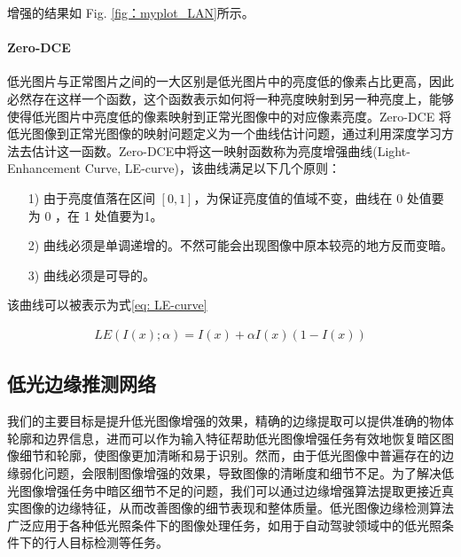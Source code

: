 \documentclass[a4paper]{ctexart}
\begin{document}
	增强的结果如 Fig. \ref{fig：myplot_LAN}所示。
	
	\paragraph{Zero-DCE} 
	
	低光图片与正常图片之间的一大区别是低光图片中的亮度低的像素占比更高，因此必然存在这样一个函数，这个函数表示如何将一种亮度映射到另一种亮度上，能够使得低光图片中亮度低的像素映射到正常光图像中的对应像素亮度。Zero-DCE 将低光图像到正常光图像的映射问题定义为一个曲线估计问题，通过利用深度学习方法去估计这一函数。Zero-DCE中将这一映射函数称为亮度增强曲线(Light-Enhancement Curve, LE-curve)，该曲线满足以下几个原则：
	
	\begin{itemize}
		\item [1)]
		由于亮度值落在区间 $[0, 1]$，为保证亮度值的值域不变，曲线在 0 处值要为 0 ，在 1 处值要为1。
		
		\item [2)]
		曲线必须是单调递增的。不然可能会出现图像中原本较亮的地方反而变暗。
		
		\item [3)]
		曲线必须是可导的。
		
	\end{itemize}
	
	该曲线可以被表示为式\ref{eq: LE-curve}
	
	\begin{equation}
		\begin{aligned}
			LE(I(x); \alpha) = I(x) + \alpha I(x)(1-I(x))
		\end{aligned}
		\label{eq: LE-curve}
	\end{equation}
	
	\subsection{低光边缘推测网络}
	
	我们的主要目标是提升低光图像增强的效果，精确的边缘提取可以提供准确的物体轮廓和边界信息，进而可以作为输入特征帮助低光图像增强任务有效地恢复暗区图像细节和轮廓，使图像更加清晰和易于识别。然而，由于低光图像中普遍存在的边缘弱化问题，会限制图像增强的效果，导致图像的清晰度和细节不足。为了解决低光图像增强任务中暗区细节不足的问题，我们可以通过边缘增强算法提取更接近真实图像的边缘特征，从而改善图像的细节表现和整体质量。低光图像边缘检测算法广泛应用于各种低光照条件下的图像处理任务，如用于自动驾驶领域中的低光照条件下的行人目标检测等任务。
	
\end{document}

